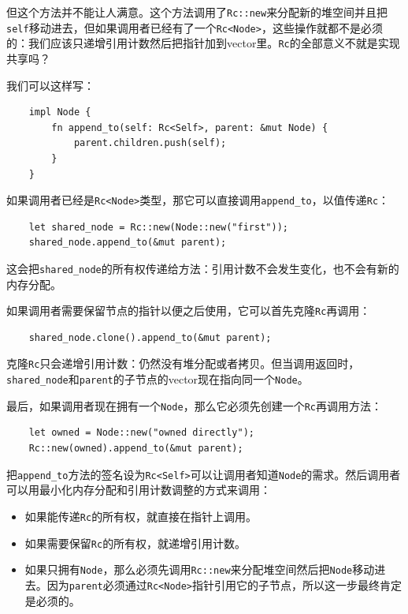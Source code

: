 但这个方法并不能让人满意。这个方法调用了\texttt{Rc::new}来分配新的堆空间并且把\texttt{self}移动进去，但如果调用者已经有了一个\texttt{Rc<Node>}，这些操作就都不是必须的：我们应该只递增引用计数然后把指针加到vector里。\texttt{Rc}的全部意义不就是实现共享吗？

我们可以这样写：
\begin{verbatim}
    impl Node {
        fn append_to(self: Rc<Self>, parent: &mut Node) {
            parent.children.push(self);
        }
    }
\end{verbatim}

如果调用者已经是\texttt{Rc<Node>}类型，那它可以直接调用\texttt{append\_to}，以值传递\texttt{Rc}：
\begin{verbatim}
    let shared_node = Rc::new(Node::new("first"));
    shared_node.append_to(&mut parent);
\end{verbatim}

这会把\texttt{shared\_node}的所有权传递给方法：引用计数不会发生变化，也不会有新的内存分配。

如果调用者需要保留节点的指针以便之后使用，它可以首先克隆\texttt{Rc}再调用：
\begin{verbatim}
    shared_node.clone().append_to(&mut parent);
\end{verbatim}

克隆\texttt{Rc}只会递增引用计数：仍然没有堆分配或者拷贝。但当调用返回时，\texttt{shared\_node}和\texttt{parent}的子节点的vector现在指向同一个\texttt{Node}。

最后，如果调用者现在拥有一个\texttt{Node}，那么它必须先创建一个\texttt{Rc}再调用方法：
\begin{verbatim}
    let owned = Node::new("owned directly");
    Rc::new(owned).append_to(&mut parent);
\end{verbatim}

把\texttt{append\_to}方法的签名设为\texttt{Rc<Self>}可以让调用者知道\texttt{Node}的需求。然后调用者可以用最小化内存分配和引用计数调整的方式来调用：
\begin{itemize}
    \item 如果能传递\texttt{Rc}的所有权，就直接在指针上调用。
    \item 如果需要保留\texttt{Rc}的所有权，就递增引用计数。
    \item 如果只拥有\texttt{Node}，那么必须先调用\texttt{Rc::new}来分配堆空间然后把\texttt{Node}移动进去。因为\texttt{parent}必须通过\texttt{Rc<Node>}指针引用它的子节点，所以这一步最终肯定是必须的。
\end{itemize}

